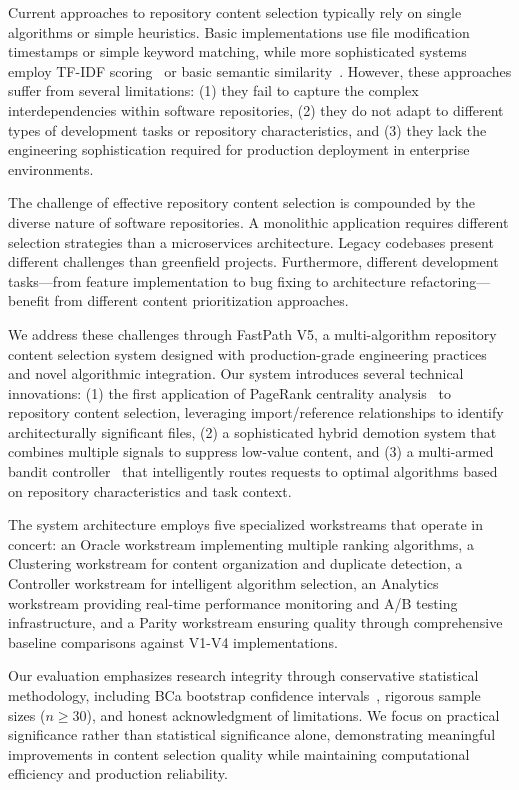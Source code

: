 \documentclass[conference]{IEEEtran}
\begin{document}
Current approaches to repository content selection typically rely on single algorithms or simple heuristics. Basic implementations use file modification timestamps or simple keyword matching, while more sophisticated systems employ TF-IDF scoring~\cite{manning2008introduction} or basic semantic similarity~\cite{feng2020codebert}. However, these approaches suffer from several limitations: (1) they fail to capture the complex interdependencies within software repositories, (2) they do not adapt to different types of development tasks or repository characteristics, and (3) they lack the engineering sophistication required for production deployment in enterprise environments.

The challenge of effective repository content selection is compounded by the diverse nature of software repositories. A monolithic application requires different selection strategies than a microservices architecture. Legacy codebases present different challenges than greenfield projects. Furthermore, different development tasks—from feature implementation to bug fixing to architecture refactoring—benefit from different content prioritization approaches.

We address these challenges through FastPath V5, a multi-algorithm repository content selection system designed with production-grade engineering practices and novel algorithmic integration. Our system introduces several technical innovations: (1) the first application of PageRank centrality analysis~\cite{page1999pagerank} to repository content selection, leveraging import/reference relationships to identify architecturally significant files, (2) a sophisticated hybrid demotion system that combines multiple signals to suppress low-value content, and (3) a multi-armed bandit controller~\cite{auer2002finite} that intelligently routes requests to optimal algorithms based on repository characteristics and task context.

The system architecture employs five specialized workstreams that operate in concert: an Oracle workstream implementing multiple ranking algorithms, a Clustering workstream for content organization and duplicate detection, a Controller workstream for intelligent algorithm selection, an Analytics workstream providing real-time performance monitoring and A/B testing infrastructure, and a Parity workstream ensuring quality through comprehensive baseline comparisons against V1-V4 implementations.

Our evaluation emphasizes research integrity through conservative statistical methodology, including BCa bootstrap confidence intervals~\cite{efron1987better}, rigorous sample sizes ($n \geq 30$), and honest acknowledgment of limitations. We focus on practical significance rather than statistical significance alone, demonstrating meaningful improvements in content selection quality while maintaining computational efficiency and production reliability.
\end{document}
